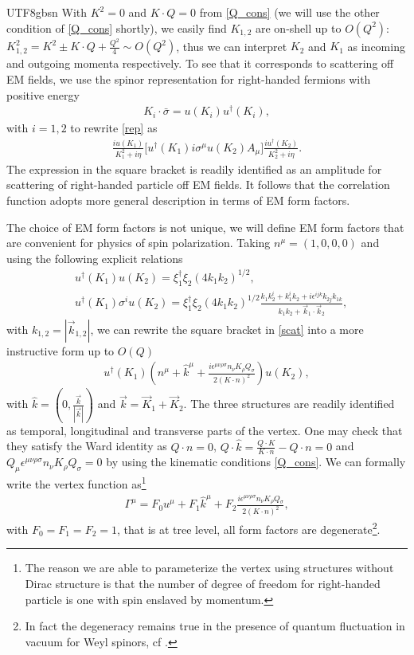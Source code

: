 \documentclass[11pt]{article}\def\baselinestretch{1.4}
\def\e{{\epsilon}}
\def\G{{\Gamma}}
\def\h{\eta}
\def\m{{\mu}}
\def\n{{\nu}}
\def\r{{\rho}}
\def\s{{\sigma}}
\def\x{{\xi}}
\def\({\left(}
\def\){\right)}
\newcommand{\dg}{\dagger}
\begin{document}
\begin{CJK}{UTF8}{gbsn}
With $K^2=0$ and $K\cdot Q=0$ from \eqref{Q_cons} (we will use the other condition of \eqref{Q_cons} shortly), we easily find $K_{1,2}$ are on-shell up to $O(Q^2)$: $K_{1,2}^2=K^2\pm K\cdot Q+\frac{Q^2}{4}\sim O(Q^2)$, thus we can interpret $K_2$ and $K_1$ as incoming and outgoing momenta respectively. To see that it corresponds to scattering off EM fields, we use the spinor representation for right-handed fermions with positive energy
\begin{align}
K_i\cdot\bar{\s}=u(K_i)u^\dg(K_i),
\end{align}
with $i=1,2$ to rewrite \eqref{rep} as
\begin{align}\label{scat}
\frac{iu(K_1)}{K_1^2+i\h}\big[u^\dg(K_1) i\s^\m u(K_2)A_\m\big]\frac{iu^\dg(K_2)}{K_2^2+i\h}.
\end{align}
The expression in the square bracket is readily identified as an amplitude for scattering of right-handed particle off EM fields. It follows that the correlation function adopts more general description in terms of EM form factors.

The choice of EM form factors is not unique, we will define EM form factors that are convenient for physics of spin polarization. Taking $n^\m=(1,0,0,0)$ and using the following explicit relations \cite{Dong:2021fxn}
\begin{align}\label{spinor_products}
&u^\dg(K_1)u(K_2) = \x_1^\dg\x_2(4k_1k_2)^{1/2},\nonumber\\
&u^\dg(K_1)\s^i u(K_2) = \x_1^\dg\x_2(4k_1k_2)^{1/2}\frac{k_1k^i_2+k^i_1k_2+i\e^{ijk}k_{2j}k_{1k}}{k_1k_2+\vec{k}_1\cdot\vec{k}_2},
\end{align}
with $k_{1,2}=|\vec{k}_{1,2}|$, we can rewrite the square bracket in \eqref{scat} into a more instructive form up to $O(Q)$
\begin{align}
u^\dg(K_1) \(n^\m+\hat{k}^\m+\frac{i\e^{\m\n\r\s} n_\n K_\r Q_\s}{2(K\cdot n)^2}\) u(K_2),
\end{align}
with $\hat{k}=(0,\frac{\vec{k}}{|\vec{k}|})$ and $\vec{k}=\vec{K}_1+\vec{K}_2$. The three structures are readily identified as temporal, longitudinal and transverse parts of the vertex. One may check that they satisfy the Ward identity as $Q\cdot n=0$, $Q\cdot\hat{k}=\frac{Q\cdot K}{K\cdot n}-Q\cdot n=0$ and $Q_\m \e^{\m\n\r\s} n_\n K_\r Q_\s=0$ by using the kinematic conditions \eqref{Q_cons}. We can formally write the vertex function as\footnote{The reason we are able to parameterize the vertex using structures without Dirac structure is that the number of degree of freedom for right-handed particle is one with spin enslaved by momentum.}
\begin{align}%
\G^\m=F_0u^\m+F_1\hat{k}^\m+F_2\frac{i\e^{\m\n\r\s}n_\n K_\r Q_\s}{2(K\cdot n)^2},
\end{align}
with $F_0=F_1=F_2=1$, that is at tree level, all form factors are degenerate\footnote{In fact the degeneracy remains true in the presence of quantum fluctuation in vacuum for Weyl spinors, cf \cite{Giunti:2014ixa}.}.


\end{CJK}
\end{document}
